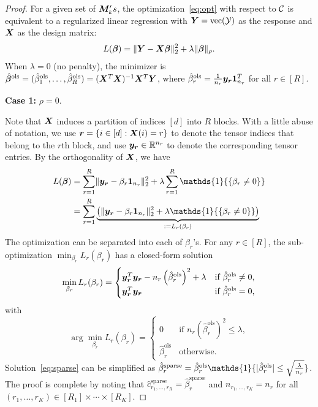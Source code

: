 \documentclass{article}
\newcommand*{\KeepStyleUnderBrace}[1]{%
  \mathop{%
    \mathchoice
    {\underbrace{\displaystyle#1}}%
    {\underbrace{\textstyle#1}}%
    {\underbrace{\scriptstyle#1}}%
    {\underbrace{\scriptscriptstyle#1}}%
  }\limits
}
\begin{document}
\begin{appendices}
\begin{proof}
For a given set of $\boldsymbol{M}_k's$, the optimization~\eqref{eq:opt} with respect to $\mathcal{C}$ is equivalent to a regularized linear regression with $\bm Y=\text{vec}(\mathcal{Y})$ as the response and $\bm X$ as the design matrix:
\begin{equation}\label{eq:opt}
L({\bm \beta})=\lVert\bm Y-\bm X \bm{\beta}\rVert_2^2+\lambda\lVert\bm{\beta}\rVert_\rho.
\end{equation}
When $\lambda=0$ (no penalty), the minimizer is $\hat {\bm \beta}^{\text{ols}}=(\hat \beta^{\text{ols}}_1,\ldots,\hat \beta^{\text{ols}}_R)=(\bm X^T\bm X)^{-1}\bm X^T\bm Y$, where $\hat \beta^{\text{ols}}_r={1\over n_r}\bm{y}_{\bm{r}}\mathbf{1}^T_{n_r}$ for all $r\in[R]$.

{\bf Case 1: } $\rho=0$.\par
Note that $\bm X$ induces a partition of indices $[d]$ into $R$ blocks. With a little abuse of notation, we use ${\bm{r}}=\{i\in[d]:\bm X(i)=r\}$ to denote the tensor indices that belong to the $r$th block, and use $\bm{y}_{\bm{r}}\in\mathbb{R}^{n_r}$ to denote the corresponding tensor entries. By the orthogonality of $\bm X$, we have
\begin{equation}
\begin{split}
L(\boldsymbol{\beta})&=\sum_{r=1}^R \vnormSize{}{\my_{\mr}-\beta_r\mathbf{1}_{n_r}}^2+\lambda \sum_{r=1}^R \mathds{1}{\{ \beta_r\neq 0\}}\\
&=\sum_{r=1}^R\KeepStyleUnderBrace{\left( \vnormSize{}{\my_{\mr}-\beta_r\mathbf{1}_{n_r}}^2+\lambda \mathds{1}{\{ \beta_r\neq 0\}}\right)}_{:=L_r(\beta_r)}
\end{split}
\end{equation}
The optimization can be separated into each of $\beta_r$'s. For any $r\in[R]$, the sub-optimization $\min_{\beta_r}L_r(\beta_r)$ has a closed-form solution
\[
\min_{\beta_r} L_r(\beta_r)
=\begin{cases}
\bm{y}^T_{\bm{r}}\bm{y}_{\bm{r}}-n_r\left(\hat \beta_r^{\text{ols}}\right)^2+\lambda& \text{if $\hat \beta^{\text{ols}}_r\neq 0$,}\\
\bm{y}^T_{\bm{r}}\bm{y}_{\bm{r}}&\text{if $\hat \beta^{\text{ols}}_r=0$,}
\end{cases}
\]
with
\begin{equation}\label{eq:sparse}
\arg\min_{\beta_r} L_r(\beta_r)=
\begin{cases}
0\quad& \text{if $n_r\left(\hat \beta_r^{\text{ols}}\right)^2 \leq \lambda$},\\
\hat \beta_r^{\text{ols}} &\text{otherwise}.
\end{cases}
\end{equation}
Solution~\eqref{eq:sparse} can be simplified as $\hat \beta^{\text{sparse}}_r=\hat \beta^{\text{ols}}_r\mathds{1}\{|\hat \beta^{\text{ols}}_r| \leq \sqrt{\lambda \over n_r}\}$. The proof is complete by noting that $\hat c^{\text{sparse}}_{r_1,\ldots,r_R}=\hat \beta^{\text{sparse}}_r$ and $n_{r_1,\ldots,r_K}=n_r$ for all $(r_1,\ldots,r_K)\in[R_1]\times \cdots \times [R_K]$.




\end{proof}
\end{appendices}
\end{document}
